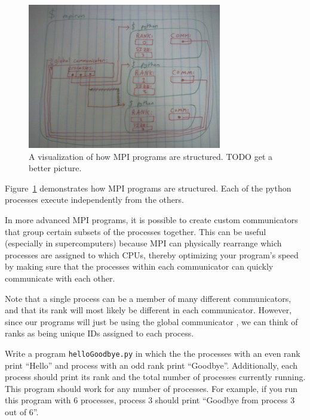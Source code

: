 \begin{figure}[htbp]
\centering
\includegraphics[width=.9\textwidth]{MPI_program_structure_placeholder.png}
\caption{A visualization of how MPI programs are structured. TODO get a better picture.}
\label{fig:MPI_program_structure}
\end{figure}

Figure~\ref{fig:MPI_program_structure} demonstrates how MPI programs are
structured. Each of the python processes execute independently from the others.

\begin{info}
In more advanced MPI programs, it is possible to create custom communicators
that group certain subsets of the processes together. This can be useful
(especially in supercomputers) because MPI can physically rearrange which
processes are assigned to which CPUs, thereby optimizing your program's speed by
making sure that the processes within each communicator can quickly communicate
with each other.

Note that a single process can be a member of many different communicators, and
that its rank will most likely be different in each communicator. However, since
our programs will just be using the global communicator , we
can think of ranks as being unique IDs assigned to each process.
\end{info}

\begin{problem}
Write a program \texttt{helloGoodbye.py} in which the the processes with an even
rank print ``Hello'' and process with an odd rank print ``Goodbye''.
Additionally, each process should print its rank and the total number of
processes currently running. This program should work for any number of
processes. For example, if you run this program with 6 processes, process 3
should print ``Goodbye from process 3 out of 6''.
\label{prob:MPI_Intro:helloGoodbye.py}
\end{problem}

